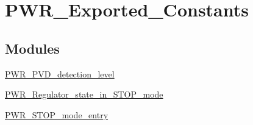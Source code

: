 \hypertarget{group___p_w_r___exported___constants}{\section{P\-W\-R\-\_\-\-Exported\-\_\-\-Constants}
\label{group___p_w_r___exported___constants}
}
\subsection*{Modules}
\begin{DoxyCompactItemize}
\item 
\hyperlink{group___p_w_r___p_v_d__detection__level}{P\-W\-R\-\_\-\-P\-V\-D\-\_\-detection\-\_\-level}
\item 
\hyperlink{group___p_w_r___regulator__state__in___s_t_o_p__mode}{P\-W\-R\-\_\-\-Regulator\-\_\-state\-\_\-in\-\_\-\-S\-T\-O\-P\-\_\-mode}
\item 
\hyperlink{group___p_w_r___s_t_o_p__mode__entry}{P\-W\-R\-\_\-\-S\-T\-O\-P\-\_\-mode\-\_\-entry}
\end{DoxyCompactItemize}
